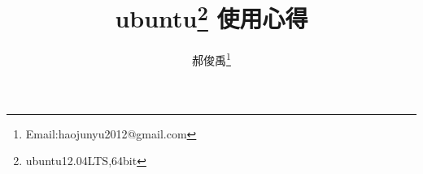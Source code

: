 \documentclass[10pt,a4paper]{article}
\begin{document}
\begin{CJK*}{UTF8}{gkai}
\title{ubuntu\thanks{ubuntu12.04LTS,64bit} 使用心得}					   						%
\author{郝俊禹\thanks{Email:haojunyu2012@gmail.com}}				%
\date{}                                             				%
\maketitle                                          				%
\tableofcontents 												%
\clearpage


%
%


\clearpage     
\end{CJK*}
\end{document}
